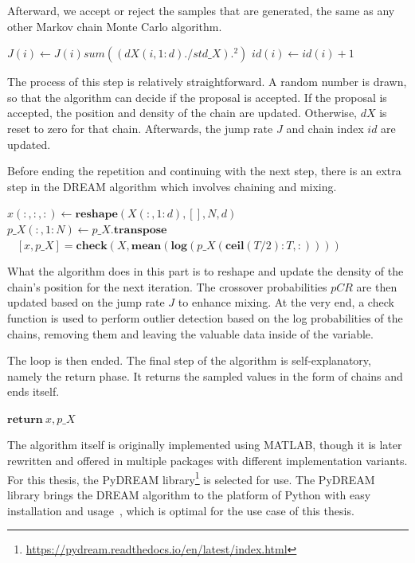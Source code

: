 Afterward, we accept or reject the samples that are generated, the same as any other Markov chain Monte Carlo algorithm.

\begin{algorithm}[H]
$J(i) \gets J(i) sum((dX(i, 1:d) ./ std\_X).^2)$
$id(i) \gets id(i) + 1$
\end{algorithm}

The process of this step is relatively straightforward. A random number is drawn, so that the algorithm can decide if the proposal is accepted. If the proposal is accepted, the position and density of the chain are updated. Otherwise, $dX$ is reset to zero for that chain. Afterwards, the jump rate $J$ and chain index $id$ are updated.

Before ending the repetition and continuing with the next step, there is an extra step in the DREAM algorithm which involves chaining and mixing.

\begin{algorithm}[H]
$x(:, :, :) \gets \textbf{reshape}(X(:, 1:d), [], N, d)$\\
$p\_X(:, 1:N) \gets p\_X.\textbf{transpose}$\\\
$[x, p\_X] = \textbf{check}(X, \textbf{mean}(\textbf{log}(p\_X(\textbf{ceil}(T/2):T, :))))$
\end{algorithm}
What the algorithm does in this part is to reshape and update the density of the chain's position for the next iteration. The crossover probabilities $pCR$ are then updated based on the jump rate $J$ to enhance mixing. At the very end, a check function is used to perform outlier detection based on the log probabilities of the chains, removing them and leaving the valuable data inside of the variable.

The loop is then ended. The final step of the algorithm is self-explanatory, namely the return phase. It returns the sampled values in the form of chains and ends itself.
\begin{algorithm}
    $\textbf{return}\  x, p\_X$
\end{algorithm}

The algorithm itself is originally implemented using MATLAB, though it is later rewritten and offered in multiple packages with different implementation variants. For this thesis, the PyDREAM library\footnote{\url{https://pydream.readthedocs.io/en/latest/index.html}} is selected for use. The PyDREAM library brings the DREAM algorithm to the platform of Python with easy installation and usage~\cite{pydream}, which is optimal for the use case of this thesis.

